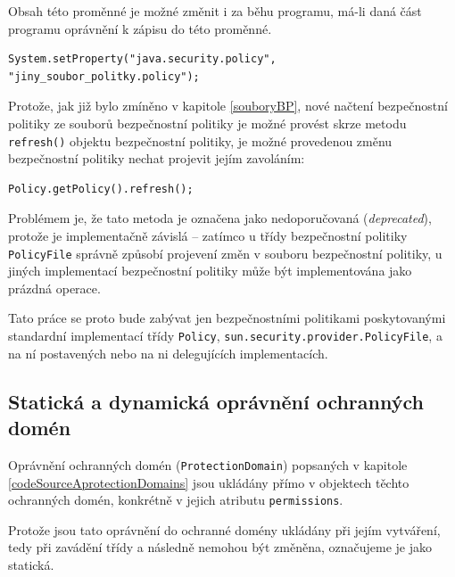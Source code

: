Obsah této proměnné je možné změnit i za běhu programu, má-li daná část programu oprávnění k zápisu do této proměnné.

\begin{lstlisting}[caption=Nastavení souboru bezpečnostní politiky zevnitř JVM, label=nastaveniBP3]
System.setProperty("java.security.policy", "jiny_soubor_politky.policy");
\end{lstlisting}

Protože, jak již bylo zmíněno v kapitole \ref{souboryBP}, nové načtení bezpečnostní politiky ze souborů bezpečnostní politiky je možné provést
skrze metodu {\tt refresh()} objektu bezpečnostní politiky, je možné provedenou změnu bezpečnostní politiky nechat projevit jejím zavoláním:

\begin{lstlisting}[caption=Znovunačtení souboru bezpečnostní politiky, label=refreshBP]
Policy.getPolicy().refresh();
\end{lstlisting}

Problémem je, že tato metoda je označena jako nedoporučovaná ({\it deprecated}), protože je implementačně závislá -- zatímco u třídy bezpečnostní politiky {\tt PolicyFile} správně způsobí projevení změn v souboru bezpečnostní politiky, u jiných implementací bezpečnostní politiky může být implementována jako prázdná operace. \cite{refPolicy}

Tato práce se proto bude zabývat jen bezpečnostními politikami poskytovanými standardní implementací třídy {\tt Policy}, {\tt sun.security.provider.PolicyFile}, a na ní postavených nebo na ni delegujících implementacích.

\subsection{Statická a dynamická oprávnění ochranných domén} \label{staticPerm}

Oprávnění ochranných domén ({\tt ProtectionDomain}) popsaných v kapitole \ref{codeSourceAprotectionDomains} jsou ukládány přímo v objektech těchto ochranných domén,
konkrétně v jejich atributu {\tt permissions}.~\cite{sourceProtectionDomain}

Protože jsou tato oprávnění do ochranné domény ukládány při jejím vytváření, tedy při zavádění třídy a následně nemohou být změněna, označujeme je jako statická.

